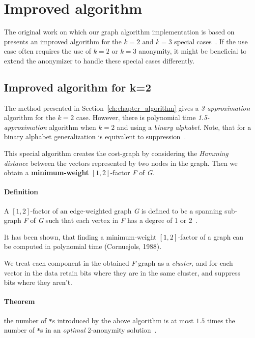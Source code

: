 \section{Improved algorithm}

The original work on which our graph algorithm implementation is based on presents an improved algorithm for the \(k=2\) and \(k=3\) special cases~\cite{aggarwal}. If the use case often requires the use of \(k=2\) or \(k=3\) anonymity, it might be beneficial to extend the anonymizer to handle these special cases differently.

\subsection{Improved algorithm for k=2}\label{subsec:improved_algorithm}
The method presented in Section~\ref{ch:chapter_algorithm} gives a \textit{3-approximation} algorithm for the \(k=2\) case. However, there is polynomial time \textit{1.5-approximation} algorithm when \(k=2\) and using a \textit{binary alphabet}. Note, that for a binary alphabet generalization is equivalent to suppression~\cite{aggarwal}.

This special algorithm creates the cost-graph by considering the \textit{Hamming distance} between the vectors represented by two nodes in the graph. Then we obtain a \textbf{minimum-weight} \([1,2]\)-factor \textit{F} of \textit{G}.

\paragraph{Definition} A \([1,2]\)-factor of an edge-weighted graph \textit{G} is defined to be a spanning sub-graph \textit{F} of \textit{G} such that each vertex in \textit{F} has a degree of 1 or 2~\cite{aggarwal}.

It has been shown, that finding a minimum-weight \([1,2]\)-factor of a graph can be computed in polynomial time (Cornuejols, 1988).

We treat each component in the obtained \textit{F} graph as a \textit{cluster}, and for each vector in the data retain bits where they are in the same cluster, and suppress bits where they aren't.

\paragraph{Theorem} the number of \texttt{*}s introduced by the above algorithm is at most \(1.5\) times the number of \texttt{*}s in an \textit{optimal} 2-anonymity solution~\cite{aggarwal}.

